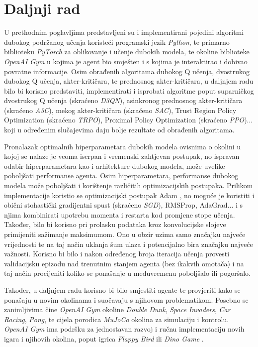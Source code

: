 \chapter{Daljnji rad}

U prethodnim poglavljima predstavljeni su i implementirani pojedini algoritmi dubokog podržanog učenja koristeći programski jezik \textit{Python}, te primarno biblioteku \textit{PyTorch} za oblikovanje i učenje dubokih modela, te okoline biblioteke \textit{OpenAI Gym} u kojima je agent bio smješten i s kojima je interaktirao i dobivao povratne informacije. Osim obrađenih algoritama dubokog Q učenja, dvostrukog dubokog Q učenja, akter-kritičara, te prednosnog akter-kritičara, u daljnjem radu bilo bi korisno predstaviti, implementirati i isprobati algoritme poput suparničkog dvostrukog Q učenja  (skraćeno \textit{D3QN}), asinkronog prednosnog akter-kritičara  (skraćeno \textit{A3C}), mekog akter-kritičara  (skraćeno \textit{SAC}), Trust Region Policy Optimization (skraćeno \textit{TRPO}), Proximal Policy Optimization (skraćeno \textit{PPO})... koji u određenim slučajevima daju bolje rezultate od obrađenih algoritama.

Pronalazak optimalnih hiperparametara dubokih modela ovisnima o okolini u kojoj se nalaze je veoma iscrpan i vremenski zahtjevan postupak, no ispravan odabir hiperparametara kao i arhitekture dubokog modela, može uvelike poboljšati performanse agenta. Osim hiperparametara, performanse dubokog modela može poboljšati i korištenje različitih optimizacijskih postupaka. Prilikom implementacije koristio se optimizacijski postupak Adam , no moguće je koristiti i obični stohastički gradijentni spust  (skraćeno \textit{SGD}), RMSProp, AdaGrad... i s njima kombinirati upotrebu momenta i restarta kod promjene stope učenja. Također, bilo bi korisno pri prolasku podataka kroz konvolucijske slojeve primijeniti sažimanje maksimumom. Ono u obzir uzima samo značajku najveće vrijednosti te na taj način uklanja šum ulaza i potencijalno bira značajku najveće važnosti. Korisno bi bilo i nakon određenog broja iteracija učenja provesti validacijsku epizodu nad trenutnim stanjem agenta (bez ikakvih omotača) i na taj način procijeniti koliko se ponašanje u međuvremenu poboljšalo ili pogoršalo.

Također, u daljnjem radu korisno bi bilo smjestiti agente te provjeriti kako se ponašaju u novim okolinama i suočavaju s njihovom problematikom. Posebno se zanimljivima čine \textit{OpenAI Gym} okoline \textit{Double Dunk}, \textit{Space Invaders}, \textit{Car Racing}, \textit{Pong}, te cijela porodica \textit{MuJoCo} okolina za simulaciju i kontrolu. \textit{OpenAI Gym} ima podršku za jednostavan razvoj i ručnu implementaciju novih igara i njihovih okolina, poput igrica \textit{Flappy Bird} \cite{CustomFlappyBird} ili \textit{Dino Game} \cite{CustomDinoGame}.

